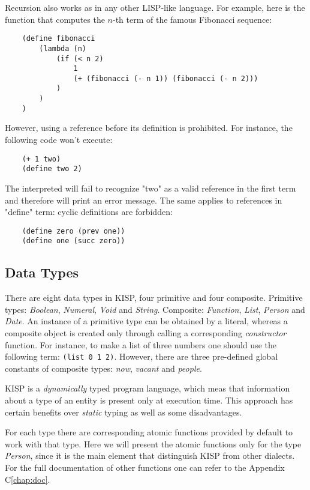     Recursion also works as in any other LISP-like language. For example, here is the function that computes the $n$-th term of
    the famous Fibonacci sequence:
    \begin{verbatim}
    (define fibonacci
        (lambda (n)
            (if (< n 2)
                1
                (+ (fibonacci (- n 1)) (fibonacci (- n 2)))
            )
        )
    )
    \end{verbatim}
    However, using a reference before its definition is prohibited. For instance, the following code won't execute:
    \begin{verbatim}
    (+ 1 two)
    (define two 2)
    \end{verbatim}
    The interpreted will fail to recognize "two" as a valid reference in the first term and therefore will print an error message.
    The same applies to references in "define" term: cyclic definitions are forbidden:
    \begin{verbatim}
    (define zero (prev one))
    (define one (succ zero))
    \end{verbatim}

\subsection{Data Types}
    There are eight data types in KISP, four primitive and four composite. Primitive types: \textit{Boolean}, \textit{Numeral},
    \textit{Void} and \textit{String}. Composite: \textit{Function}, \textit{List}, \textit{Person} and \textit{Date}. An instance of
    a primitive type can be obtained by a literal, whereas a composite object is created only through calling a corresponding
    \textit{constructor} function. For instance, to make a list of three numbers one should use the following term: \texttt{(list 0 1
    2)}. However, there are three pre-defined global constants of composite types: \textit{now}, \textit{vacant} and \textit{people}.

    KISP is a \textit{dynamically} typed program language, which meas that information about a type of an entity is present only at
    execution time. This approach has certain benefits over \textit{static} typing as well as some disadvantages.

    For each type there are corresponding atomic functions provided by default to work with that type. Here we will present the atomic
    functions only for the type \textit{Person}, since it is the main element that distinguish KISP from other dialects. For the full
    documentation of other functions one can refer to the Appendix C\ref{chap:doc}.


